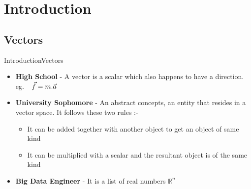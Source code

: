 \documentclass[10pt]{beamer}
\begin{document}
\section{Introduction}
\subsection{Vectors}
\begin{frame}{Introduction}{Vectors}

\begin{itemize}
\item \textbf{High School} - A vector is a scalar which also happens to have a direction. eg. $ \hspace{0.1in} \vec{f} = m.\vec{a} $
\item \textbf{University Sophomore} - An abstract concepts, an entity that resides in a vector space. It follows these two rules :-
\begin{itemize}
\item It can be added together with another object to get an object of same kind
\item It can be multiplied with a scalar and the resultant object is of the same kind
\end{itemize}
\item \textbf{Big Data Engineer} - It is a list of real numbers $\mathbb{R}^{n}$
\end{itemize}


\end{frame}
\end{document}

